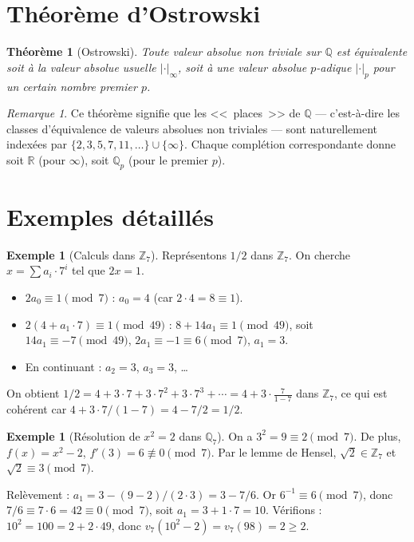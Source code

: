 \documentclass[12pt,a4paper,openany]{book}
\theoremstyle{definition}
\newtheorem{exemple}[definition]{Exemple}
\theoremstyle{plain}
\newtheorem{theoreme}[definition]{Théorème}
\theoremstyle{remark}
\newtheorem{remarque}[definition]{Remarque}
\newcommand{\Z}{\mathbb{Z}}
\newcommand{\Q}{\mathbb{Q}}
\newcommand{\R}{\mathbb{R}}
\newcommand{\abs}[1]{\left|#1\right|}
\begin{document}
\section{Théorème d'Ostrowski}
\label{sec:ostrowski}

\begin{theoreme}[Ostrowski]
\label{thm:ostrowski}
Toute valeur absolue non triviale sur $\Q$ est équivalente soit à la valeur
absolue usuelle $\abs{\cdot}_\infty$, soit à une valeur absolue $p$-adique
$\abs{\cdot}_p$ pour un certain nombre premier $p$.
\end{theoreme}

\begin{remarque}
\label{rem:ostrowski-places}
Ce théorème signifie que les <<~places~>> de $\Q$ --- c'est-à-dire
les classes d'équivalence de valeurs absolues non triviales --- sont naturellement
indexées par $\{2, 3, 5, 7, 11, \ldots\} \cup \{\infty\}$. Chaque complétion
correspondante donne soit $\R$ (pour $\infty$), soit $\Q_p$ (pour le premier $p$).
\end{remarque}

\section{Exemples détaillés}
\label{sec:p-adic-exemples}

\begin{exemple}[Calculs dans $\Z_7$]
\label{ex:calculs-Z7}
Représentons $1/2$ dans $\Z_7$. On cherche $x = \sum a_i \cdot 7^i$ tel que $2x = 1$.
\begin{itemize}
  \item $2a_0 \equiv 1 \pmod{7}$ : $a_0 = 4$ (car $2 \cdot 4 = 8 \equiv 1$).
  \item $2(4 + a_1 \cdot 7) \equiv 1 \pmod{49}$ : $8 + 14a_1 \equiv 1 \pmod{49}$,
    soit $14a_1 \equiv -7 \pmod{49}$, $2a_1 \equiv -1 \equiv 6 \pmod{7}$, $a_1 = 3$.
  \item En continuant : $a_2 = 3$, $a_3 = 3$, \ldots
\end{itemize}
On obtient $1/2 = 4 + 3 \cdot 7 + 3 \cdot 7^2 + 3 \cdot 7^3 + \cdots = 4 + 3 \cdot \frac{7}{1 - 7}$
dans $\Z_7$, ce qui est cohérent car $4 + 3 \cdot 7 / (1-7) = 4 - 7/2 = 1/2$.
\end{exemple}

\begin{exemple}[{Résolution de $x^2 = 2$ dans $\Q_7$}]
\label{ex:x2-egal-2-Q7}
On a $3^2 = 9 \equiv 2 \pmod{7}$. De plus, $f(x) = x^2 - 2$, $f'(3) = 6 \not\equiv 0
\pmod{7}$. Par le lemme de Hensel, $\sqrt{2} \in \Z_7$ et $\sqrt{2} \equiv 3 \pmod{7}$.

Relèvement : $a_1 = 3 - (9-2)/(2 \cdot 3) = 3 - 7/6$. Or $6^{-1} \equiv 6 \pmod{7}$,
donc $7/6 \equiv 7 \cdot 6 = 42 \equiv 0 \pmod{7}$, soit $a_1 = 3 + 1 \cdot 7 = 10$.
Vérifions : $10^2 = 100 = 2 + 2 \cdot 49$, donc $v_7(10^2 - 2) = v_7(98) = 2 \geq 2$.
\end{exemple}
\end{document}
